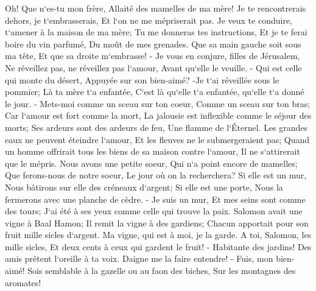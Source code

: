 \verse Oh! Que n`es-tu mon frère, Allaité des mamelles de ma mère! Je te rencontrerais dehors, je t`embrasserais, Et l`on ne me mépriserait pas. 
\verse Je veux te conduire, t`amener à la maison de ma mère; Tu me donneras tes instructions, Et je te ferai boire du vin parfumé, Du moût de mes grenades. 
\verse Que sa main gauche soit sous ma tête, Et que sa droite m`embrasse! - 
\verse Je vous en conjure, filles de Jérusalem, Ne réveillez pas, ne réveillez pas l`amour, Avant qu`elle le veuille. - 
\verse Qui est celle qui monte du désert, Appuyée sur son bien-aimé? -Je t`ai réveillée sous le pommier; Là ta mère t`a enfantée, C`est là qu`elle t`a enfantée, qu`elle t`a donné le jour. - 
\verse Mets-moi comme un sceau sur ton coeur, Comme un sceau sur ton bras; Car l`amour est fort comme la mort, La jalousie est inflexible comme le séjour des morts; Ses ardeurs sont des ardeurs de feu, Une flamme de l`Éternel. 
\verse Les grandes eaux ne peuvent éteindre l`amour, Et les fleuves ne le submergeraient pas; Quand un homme offrirait tous les biens de sa maison contre l`amour, Il ne s`attirerait que le mépris. 
\verse Nous avons une petite soeur, Qui n`a point encore de mamelles; Que ferons-nous de notre soeur, Le jour où on la recherchera? 
\verse Si elle est un mur, Nous bâtirons sur elle des créneaux d`argent; Si elle est une porte, Nous la fermerons avec une planche de cèdre. - 
\verse Je suis un mur, Et mes seins sont comme des tours; J`ai été à ses yeux comme celle qui trouve la paix. 
\verse Salomon avait une vigne à Baal Hamon; Il remit la vigne à des gardiens; Chacun apportait pour son fruit mille sicles d`argent. 
\verse Ma vigne, qui est à moi, je la garde. A toi, Salomon, les mille sicles, Et deux cents à ceux qui gardent le fruit! - 
\verse Habitante des jardins! Des amis prêtent l`oreille à ta voix. Daigne me la faire entendre! - 
\verse Fuis, mon bien-aimé! Sois semblable à la gazelle ou au faon des biches, Sur les montagnes des aromates! 
